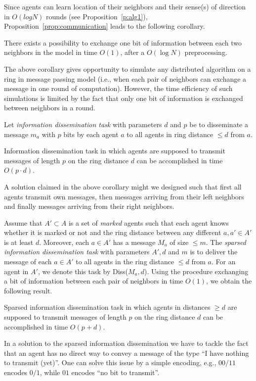 \else
{}
\fi
Since agents can learn location of their neighbors and their sense(s) of direction
in $O(log N)$ rounds (see Proposition~\ref{p:alg1}), Proposition~\ref{prop:communication}
leads to the following corollary.

\begin{corollary}
There exists a possibility to exchange one bit of information
between each two neighbors in the {\perceptive} model  in time $O(1)$, after a $O(\log N)$ preprocessing.
\end{corollary}

The above corollary gives opportunity to simulate any distributed algorithm on a ring
in message passing model (i.e., when each pair of neighbors can exchange a message in
one round of computation).
However, the time efficiency of such simulations is limited by the fact that only one bit
of information is exchanged between neighbors in a round.


Let {\em information dissemination task} with parameters $d$ and $p$ be to disseminate
a message $m_a$ with $p$ bits by each agent $a$ to all agents in ring distance $\leq d$
from $a$.
\begin{corollary}
Information dissemination task in which agents are supposed
to transmit messages of length $p$ on the ring distance $d$ can be accomplished in time $O(p\cdot d)$.
\end{corollary}
A solution claimed in the above corollary might we designed such that
first all agents transmit own messages, then messages arriving from their left neighbors and finally messages arriving from their right
neighbors.

Assume that $A'\subset A$ is a set of {\em marked} agents such that each agent
knows whether it is marked or not and the ring distance between any different $a,a'\in A'$
is at least $d$. Moreover, each $a\in A'$ has a message $M_a$ of size $\leq m$.
The {\em sparsed information dissemination task} with parameters $A',d$ and $m$
is to deliver the message of each $a\in A'$ to all agents in the ring distance
$\leq d$ from $a$. 
For an agent in $A'$, we denote this task by Diss($M_a,d$).
Using the procedure exchanging a bit of information between
each pair of neighbors in time $O(1)$, we obtain the following result.
\begin{corollary}
Sparsed information dissemination task in which agents in distances $\geq d$ are supposed
to transmit messages of length $p$ on the ring distance $d$ can be accomplished in time $O(p+d)$.
\end{corollary}
In a solution to the sparsed information dissemination we have to tackle
the fact that an agent has no direct way to convey a message of the type ``I have nothing to transmit (yet)''. One can solve this issue by a simple encoding, e.g., $00/11$ encodes $0/1$, while $01$ encodes ``no bit to transmit''.

